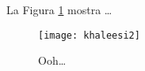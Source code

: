 \documentclass{article}
\begin{document}
La Figura \ref{fig:khal} mostra \dots

\begin{figure}
    \centering
    \texttt{[image: khaleesi2]}
    \caption{Ooh\dots}
    \label{fig:khal}
\end{figure}
\end{document}
